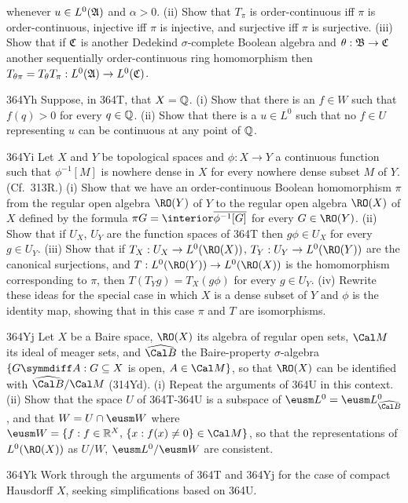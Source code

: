 {\noindent whenever $u\in L^0(\frak A)$ and $\alpha>0$.
(ii) Show that $T_{\pi}$ is order-continuous iff $\pi$ is order-continuous,
injective iff $\pi$ is injective, and surjective iff $\pi$ is surjective.
(iii) Show that if
$\frak C$ is another Dedekind $\sigma$-complete Boolean algebra
and $\theta:\frak B\to\frak C$ another sequentially order-continuous
ring homomorphism then
$T_{\theta\pi}=T_{\theta}T_{\pi}:L^0(\frak A)\to L^0(\frak C)$.

\spheader 364Yh Suppose, in 364T, that $X=\Bbb Q$.   (i) Show that there
is an $f\in W$ such that $f(q)>0$ for every $q\in\Bbb Q$.   (ii) Show
that there is a $u\in L^0$ such that no $f\in U$ representing $u$ can be
continuous at any point of $\Bbb Q$.

\spheader 364Yi Let $X$ and $Y$ be topological spaces and $\phi:X\to Y$
a continuous function such that $\phi^{-1}[M]$ is nowhere dense in $X$
for every nowhere dense subset $M$ of $Y$.   (Cf.\ 313R.)   (i) Show
that we have an order-continuous Boolean homomorphism $\pi$ from the
regular open algebra $\RO(Y)$ of $Y$ to the regular open algebra
$\RO(X)$ of $X$ defined by the formula
$\pi G=\interior\overline{\phi^{-1}[G]}$ for every $G\in\RO(Y)$.
(ii) Show that if $U_X$, $U_Y$
are the function spaces of 364T  then $g\phi\in U_X$ for every
$g\in U_Y$.   (iii) Show that if $T_X:U_X\to L^0(\RO(X))$,
$T_Y:U_Y\to L^0(\RO(Y))$ are the canonical surjections, and $T:L^0(\RO(Y))\to L^0(\RO(X))$ is the homomorphism corresponding to $\pi$, then
$T(T_Yg)=T_X(g\phi)$ for every $g\in U_Y$.   (iv) Rewrite these ideas
for the special case in which $X$ is a dense subset of $Y$ and $\phi$ is
the identity map, showing that in this case $\pi$ and $T$ are
isomorphisms.

\spheader 364Yj Let $X$ be a Baire space, $\RO(X)$ its algebra of
regular open sets, $\Cal M$ its ideal of meager sets, and
$\widehat{\Cal B}$ the Baire-property
$\sigma$-algebra $\{G\symmdiff A:G\subseteq X$ is open, $A\in\Cal M\}$,
so that $\RO(X)$ can be identified with $\widehat{\Cal B}/\Cal M$
(314Yd).   (i)
Repeat the arguments of 364U in this context.  (ii) Show that the space
$U$ of 364T-364U is a subspace of
$\eusm L^0=\eusm L^0_{\widehat{\Cal B}}$, and
that $W=U\cap\eusm W$ where
$\eusm W=\{f:f\in\Bbb R^X,\,\{x:f(x)\ne 0\}\in\Cal M\}$, so that the
representations of $L^0(\RO(X))$ as $U/W$,
$\eusm L^0/\eusm W$ are consistent.

\spheader 364Yk Work through the arguments of 364T and 364Yj for the
case of compact Hausdorff $X$, seeking simplifications based on 364U.

}
